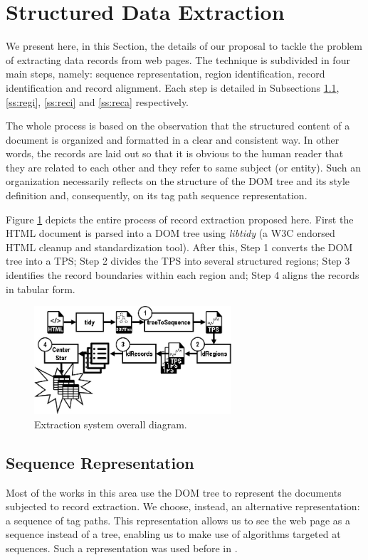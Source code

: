 \documentclass{vldb}
\begin{document}
\section{Structured Data Extraction}\label{sec:prop} We present here, in this
Section, the details of our proposal to tackle the problem of extracting data
records from web pages. The technique is subdivided in four main steps, namely:
sequence representation, region identification, record identification and record
alignment. Each step is detailed in Subsections \ref{ss:seq}, \ref{ss:regi},
\ref{ss:reci} and \ref{ss:reca} respectively.

The whole process is based on the observation that the structured content of a
document is organized and formatted in a clear and consistent way. In other
words, the records are laid out so that it is obvious to the human reader that
they are related to each other and they refer to same subject (or entity). Such
an organization necessarily reflects on the structure of the DOM tree and its
style definition and, consequently, on its tag path sequence representation.

Figure \ref{fig:overall} depicts the entire process of record extraction
proposed here. First the HTML document is parsed into a DOM tree using
\textit{libtidy}\cite{tidyw3c} (a W3C endorsed HTML cleanup and
standardization tool). After this, Step 1 converts the DOM tree into a TPS; Step
2 divides the TPS into several structured regions; Step 3 identifies the record
boundaries within each region and; Step 4 aligns the records in tabular form.

\begin{figure}[H]
  \centering
     \includegraphics[width=208pt]{img/proposal.jpg}
  \caption{Extraction system overall diagram.}
  \label{fig:overall}
\end{figure}

\subsection{Sequence Representation}\label{ss:seq}
Most of the works in this area use the DOM tree to represent the documents
subjected to record extraction. We choose, instead, an alternative
representation: a sequence of tag paths. This representation allows us to see
the web page as a sequence instead of a tree, enabling us to make use of
algorithms targeted at sequences. Such a representation was used before in
\cite{TPC09, SuffixTree12, TPS2013}.
\end{document}
